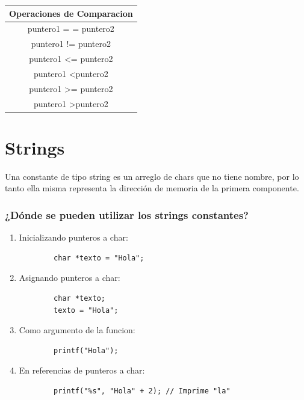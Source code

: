 \documentclass{article}
\begin{document}
\begin{table}[H] \centering
\begin{tabular}{|c|}
\hline
\rowcolor[HTML]{C0C0C0} 
\textbf{Operaciones de Comparacion} \\ \hline
puntero1 = = puntero2              \\ \hline
puntero1 != puntero2               \\ \hline
puntero1 \textless{}= puntero2     \\ \hline
puntero1 \textless puntero2        \\ \hline
puntero1 \textgreater{}= puntero2  \\ \hline
puntero1 \textgreater puntero2     \\ \hline
\end{tabular}
\end{table}

\newpage
\section{Strings}
Una constante de tipo string es un arreglo de chars que
no tiene nombre, por lo tanto ella misma representa la
dirección de memoria de la primera componente.
\subsubsection*{¿Dónde se pueden utilizar los strings constantes?}
\begin{enumerate}
    \item Inicializando punteros a char:
    \begin{lstlisting}
        char *texto = "Hola";
    \end{lstlisting}
    \item Asignando punteros a char:
    \begin{lstlisting}
        char *texto;
        texto = "Hola";
    \end{lstlisting}
    \item Como argumento de la funcion:
    \begin{lstlisting}
        printf("Hola");
    \end{lstlisting}
    \item En referencias de punteros a char:
    \begin{lstlisting}
        printf("%s", "Hola" + 2); // Imprime "la"
    \end{lstlisting}
\end{enumerate}
\end{document}
